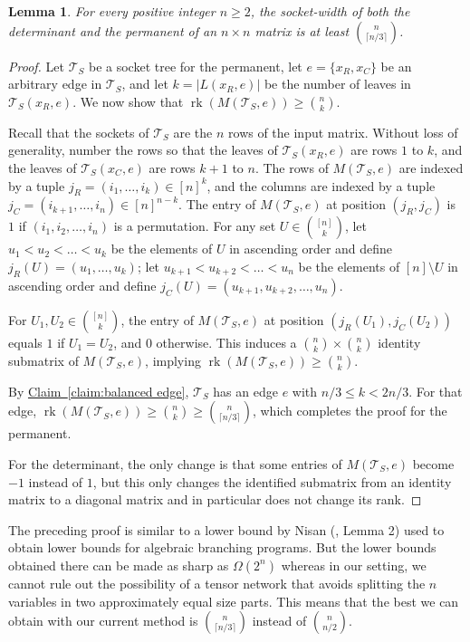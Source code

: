 \documentclass[11pt]{article}
\numberwithin{equation}{section}
\newtheorem{lemma}[theorem]{Lemma}
\theoremstyle{definition}
\theoremstyle{plain}
\newcommand{\expref}[2]{\hyperref[#2]{#1~\ref{#2}}}
\newcommand{\rk}{\ensuremath{\operatorname{rk}}}
\newcommand{\ts}{\ensuremath{\mathcal{T}_S}}
\begin{document}
\begin{lemma}
For every positive integer $n\geq 2$, the socket-width of both the determinant and the permanent of an $n\times n$ matrix is at least $\binom{n}{\lceil n/3 \rceil}$.
\end{lemma}
\begin{proof}
  Let $\ts$ be a socket tree for the permanent, let $e = \{x_R,
  x_C\}$ be an arbitrary edge in $\ts$, and let $k = |L(x_R, e)|$ 
be the number of
  leaves in $\ts(x_R, e)$.  We now show that $\rk(M(\ts, e)) \ge
  \binom{n}{k}$.

  Recall that the sockets of $\ts$ are the $n$ rows of the input
  matrix.  Without loss of generality, number the rows so that the
  leaves of $\ts(x_R, e)$ are rows $1$ to $k$, and the leaves of $\ts(x_C,
  e)$ are rows $k+1$ to $n$.  The rows of $M(\ts, e)$ are indexed by
  a tuple $j_R = (i_1, \ldots, i_k) \in [n]^k$, and the columns are indexed by a
  tuple $j_C = (i_{k+1}, \ldots, i_n) \in [n]^{n-k}$.  The entry of
  $M(\ts, e)$ at position $(j_R, j_C)$ is $1$ if $(i_1, i_2, \ldots,
  i_n)$ is a permutation.  For any set $U \in \binom{[n]}{k}$, let $u_1 <
  u_2 < \ldots < u_k$ be the elements of $U$ in ascending order and
  define $j_R(U) = (u_1, \ldots, u_k)$; let $u_{k+1} < u_{k+2} < \ldots < u_{n}$ be the elements of $[n]
  \setminus U$ in ascending order and define $j_C(U) = (u_{k+1}, u_{k+2}, \ldots,
  u_n)$.

  For $U_1, U_2 \in \binom{[n]}{k}$, the entry of $M(\ts, e)$ at position $(j_R(U_1),
  j_C(U_2))$ equals $1$ if $U_1 = U_2$, and $0$ otherwise. This
  induces a $\binom{n}{k} \times \binom{n}{k}$ identity submatrix
  of $M(\ts, e)$, implying $\rk(M(\ts, e)) \ge \binom{n}{k}$.

  By \expref{Claim}{claim:balanced edge}, $\ts$ has an edge $e$ with $n/3
  \le k < 2n/3$.  For that edge, $\rk(M(\ts, e)) \ge \binom{n}{k} \ge \binom{n}{\lceil n/3 \rceil}$, which completes the proof for the permanent.

  For the determinant, the only change is that some
  entries of $M(\ts, e)$ become $-1$ instead of $1$, but this only changes the
  identified submatrix from an identity matrix to a diagonal matrix and
  in particular does not change its rank.
\end{proof}

The preceding proof is similar to a lower bound by Nisan
(\cite{Nisan91}, Lemma 2) used to obtain lower bounds for algebraic
branching programs.  But the lower bounds obtained there can be made
as sharp as $\Omega(2^n)$ whereas in our setting, we cannot rule out
the possibility of a tensor network that avoids splitting the $n$
variables in two approximately equal size parts.  This means that the best we can
obtain with our current method is $\binom{n}{\lceil n/3 \rceil}$
instead of $\binom{n}{n/2}$.
\end{document}
